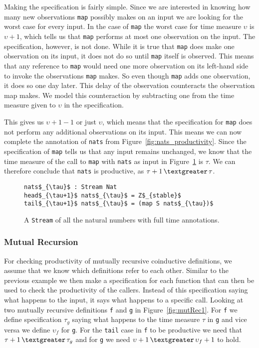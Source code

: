 Making the specification is fairly simple. Since we are interested in knowing how many new observations \texttt{map} possibly makes on an input we are looking for the worst case for every input. In the case of \texttt{map} the worst case for time measure $\upsilon$ is $\upsilon+1$, which tells us that \texttt{map} performs at most one observation on the input. The specification, however, is not done. While it is true that \texttt{map} does make one observation on its input, it does not do so until \texttt{map} itself is observed. This means that any reference to \texttt{map} would need one more observation on its left-hand side to invoke the observations \texttt{map} makes. So even though \texttt{map} adds one observation, it does so one day later. This delay of the observation counteracts the observation map makes. We model this counteraction by subtracting one from the time measure given to $\upsilon$ in the specification.

This gives us $\upsilon+1-1$ or just $\upsilon$, which means that the specification for \texttt{map} does not perform any additional observations on its input. This means we can now complete the annotation of \texttt{nats} from Figure~\ref{fig:nats_productivity}. Since the specification of \texttt{map} tells us that any input remains unchanged, we know that the time measure of the call to \texttt{map} with \texttt{nats} as input in Figure~\ref{fig:natsComplete} is $\tau$. We can therefore conclude that \texttt{nats} is productive, as $\tau+1\,\textgreater\,\tau$.

\begin{figure}
\begin{Verbatim}[commandchars=\\\{\},codes={\catcode`$=3\catcode`_=8}]
nats$_{\tau}$ : Stream Nat
head$_{\tau+1}$ nats$_{\tau}$ = Z$_{stable}$
tail$_{\tau+1}$ nats$_{\tau}$ = (map S nats$_{\tau})$
\end{Verbatim}
\caption{A \texttt{Stream} of all the natural numbers with full time annotations.}
\label{fig:natsComplete}
\end{figure}

\subsubsection{Mutual Recursion}
For checking productivity of mutually recursive coinductive definitions, we assume that we know which definitions refer to each other. Similar to the previous example we then make a specification for each function that can then be used to check the productivity of the callers. Instead of this specification saying what happens to the input, it says what happens to a specific call. Looking at two mutually recursive definitions \texttt{f} and \texttt{g} in Figure~\ref{fig:mutRec1}. For \texttt{f} we define specification $\tau_{g}$ saying what happens to the time measure $\tau$ in \texttt{g} and vice versa we define $\upsilon_{f}$ for \texttt{g}. For the \texttt{tail} case in \texttt{f} to be productive we need that $\tau+1\,\textgreater\,\tau_{g}$ and for \texttt{g} we need $\upsilon+1\,\textgreater\,\upsilon_{f}+1$ to hold.

